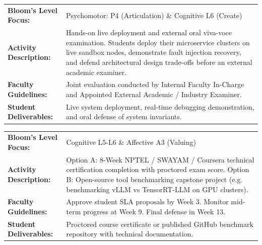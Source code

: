 \documentclass[10pt,a4paper]{article}
\begin{document}
\vspace{4pt}
\begin{table}[h!]
\centering
\small
\begin{tabularx}{\textwidth}{L{3.2cm} Y}
\toprule
{}
 \\
\midrule
\textbf{Bloom's Level Focus:} & Psychomotor: P4 (Articulation) \& Cognitive L6 (Create) \\
\textbf{Activity Description:} & Hands-on live deployment and external oral viva-voce examination. Students deploy their microservice clusters on live sandbox nodes, demonstrate fault injection recovery, and defend architectural design trade-offs before an external academic examiner. \\
\textbf{Faculty Guidelines:} & Joint evaluation conducted by Internal Faculty In-Charge and Appointed External Academic / Industry Examiner. \\
\textbf{Student Deliverables:} & Live system deployment, real-time debugging demonstration, and oral defense of system invariants. \\
\bottomrule
\end{tabularx}
\end{table}
\vspace{4pt}
\begin{table}[h!]
\centering
\small
\begin{tabularx}{\textwidth}{L{3.2cm} Y}
\toprule
{}
 \\
\midrule
\textbf{Bloom's Level Focus:} & Cognitive L5-L6 \& Affective A3 (Valuing) \\
\textbf{Activity Description:} & Option A: 8-Week NPTEL / SWAYAM / Coursera technical certification completion with proctored exam score.
Option B: Open-source tool benchmarking capstone project (e.g. benchmarking vLLM vs TensorRT-LLM on GPU clusters). \\
\textbf{Faculty Guidelines:} & Approve student SLA proposals by Week 3. Monitor mid-term progress at Week 9. Final defense in Week 13. \\
\textbf{Student Deliverables:} & Proctored course certificate or published GitHub benchmark repository with technical documentation. \\
\bottomrule
\end{tabularx}
\end{table}
\end{document}
